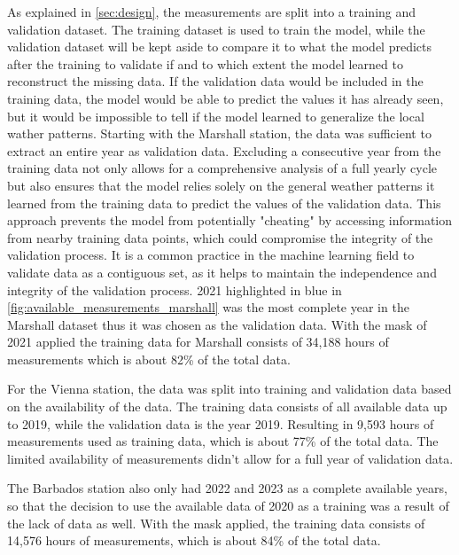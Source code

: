 As explained in \autoref{sec:design}, the measurements are split into a training and validation dataset. The training dataset is used to train the model, while the validation dataset will be kept aside to compare it to what the model predicts after the training to validate if and to which extent the model learned to reconstruct the missing data. If the validation data would be included in the training data, the model would be able to predict the values it has already seen, but it would be impossible to tell if the model learned to generalize the local wather patterns.
Starting with the Marshall station, the data was sufficient to extract an entire year as validation data. Excluding a consecutive year from the training data not only allows for a comprehensive analysis of a full yearly cycle but also ensures that the model relies solely on the general weather patterns it learned from the training data to predict the values of the validation data. This approach prevents the model from potentially "cheating" by accessing information from nearby training data points, which could compromise the integrity of the validation process. It is a common practice in the machine learning field to validate data as a contiguous set, as it helps to maintain the independence and integrity of the validation process. 2021 highlighted in blue in \ref{fig:available_measurements_marshall} was the most complete year in the Marshall dataset thus it was chosen as the validation data. With the mask of 2021 applied the training data for Marshall consists of 34,188 hours of measurements which is about 82\% of the total data.

For the Vienna station, the data was split into training and validation data based on the availability of the data. The training data consists of all available data up to 2019, while the validation data is the year 2019. Resulting in 9,593 hours of measurements used as training data, which is about 77\% of the total data. The limited availability of measurements didn't allow for a full year of validation data.

The Barbados station also only had 2022 and 2023 as a complete available years, so that the decision to use the available data of 2020 as a training was a result of the lack of data as well. With the mask applied, the training data consists of 14,576 hours of measurements, which is about 84\% of the total data.




